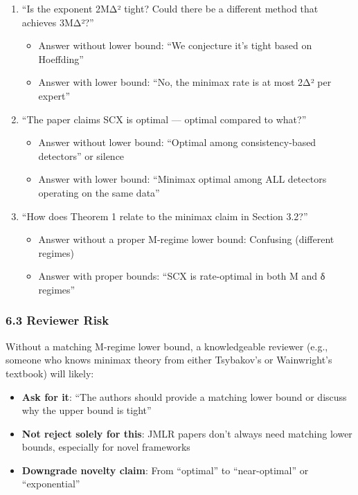 \documentclass[
  12pt,
]{ctexart}
\providecommand{\tightlist}{%
  \setlength{\itemsep}{0pt}\setlength{\parskip}{0pt}}
\begin{document}
\begin{enumerate}
\def\labelenumi{\arabic{enumi}.}
\tightlist
\item
  ``Is the exponent 2MΔ² tight? Could there be a different method that
  achieves 3MΔ²?''

  \begin{itemize}
  \tightlist
  \item
    Answer without lower bound: ``We conjecture it's tight based on
    Hoeffding''
  \item
    Answer with lower bound: ``No, the minimax rate is at most 2Δ² per
    expert''
  \end{itemize}
\item
  ``The paper claims SCX is optimal --- optimal compared to what?''

  \begin{itemize}
  \tightlist
  \item
    Answer without lower bound: ``Optimal among consistency-based
    detectors'' or silence
  \item
    Answer with lower bound: ``Minimax optimal among ALL detectors
    operating on the same data''
  \end{itemize}
\item
  ``How does Theorem 1 relate to the minimax claim in Section 3.2?''

  \begin{itemize}
  \tightlist
  \item
    Answer without a proper M-regime lower bound: Confusing (different
    regimes)
  \item
    Answer with proper bounds: ``SCX is rate-optimal in both M and δ
    regimes''
  \end{itemize}
\end{enumerate}

\subsubsection{6.3 Reviewer Risk}\label{reviewer-risk}

Without a matching M-regime lower bound, a knowledgeable reviewer (e.g.,
someone who knows minimax theory from either Tsybakov's or Wainwright's
textbook) will likely:

\begin{itemize}
\tightlist
\item
  \textbf{Ask for it}: ``The authors should provide a matching lower
  bound or discuss why the upper bound is tight''
\item
  \textbf{Not reject solely for this}: JMLR papers don't always need
  matching lower bounds, especially for novel frameworks
\item
  \textbf{Downgrade novelty claim}: From ``optimal'' to ``near-optimal''
  or ``exponential''
\end{itemize}
\end{document}
